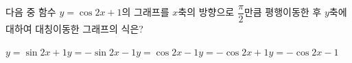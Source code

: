 다음 중 함수 $y=\cos 2x+1$의 그래프를 $x$축의 방향으로 $\dfrac{\pi}{2}$만큼 평행이동한 후 $y$축에 대하여 대칭이동한 그래프의 식은?
\begin{choicesii}{$y=\sin 2x+1$}{$y=-\sin 2x-1$}{$y=\cos 2x-1$}{$y=-\cos 2x+1$}{$y=-\cos 2x-1$}\end{choicesii}
